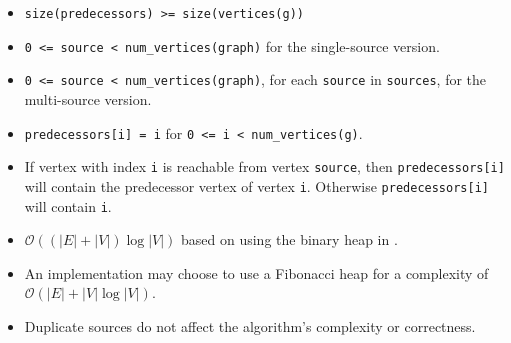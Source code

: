 \begin{itemdescr}
      \pnum\hardprecond
            \begin{itemize}
                  \item \lstinline{size(predecessors) >= size(vertices(g))}
                  \item
                        \lstinline{0 <= source < num_vertices(graph)} for the single-source version.
                  \item
                        \lstinline{0 <= source < num_vertices(graph)}, for each \lstinline{source} in \lstinline{sources}, 
                                   for the multi-source version.
            \end{itemize}
      \pnum\preconditions
            \begin{itemize}
                  \item
                        \lstinline{predecessors[i] = i} for \lstinline{0 <= i < num_vertices(g)}.
            \end{itemize}
      \pnum\effects
            \begin{itemize}
                  \item
                        If vertex with index \lstinline{i} is reachable
                        from vertex \lstinline{source}, then \lstinline{predecessors[i]} will contain the
                        predecessor vertex of vertex \lstinline{i}. Otherwise \lstinline{predecessors[i]} will contain
                        \lstinline{i}.
            \end{itemize}
      \pnum\complexity
            \begin{itemize}
                  \item $\mathcal{O}((|E| + |V|)\log{|V|})$ based on using the binary heap in .
                  \item An implementation may choose to use a Fibonacci heap for a complexity of $\mathcal{O}(|E| + |V|\log{|V|})$.
            \end{itemize}
      \pnum\remarks 
            \begin{itemize}
                  \item Duplicate sources do not affect the algorithm's complexity or correctness.
            \end{itemize}
\end{itemdescr}




